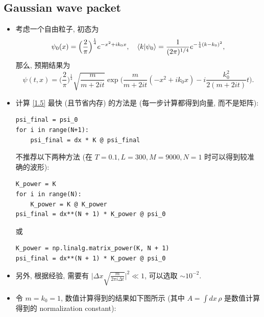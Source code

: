 \documentclass[10pt, a4paper]{article}
\numberwithin{equation}{section}
\begin{document}
	\subsection{Gaussian wave packet}
	\begin{itemize}
		\item 考虑一个自由粒子, 初态为
		\begin{equation}
			\psi_0(x) = \Big( \frac{2}{\pi} \Big)^{\frac{1}{4}} e^{- x^2 + i k_0 x}, \quad \braket{k | \psi_0} = \frac{1}{(2 \pi)^{1 / 4}} e^{- \frac{1}{4} (k - k_0)^2},
		\end{equation}
		那么, 预期结果为
		\begin{equation}
			\psi(t, x) = \Big( \frac{2}{\pi} \Big)^{\frac{1}{4}} \sqrt{\frac{m}{m + 2 i t}} \exp \Big( \frac{m}{m + 2 i t} (- x^2 + i k_0 x) - i \frac{k_0^2}{2 (m + 2 i t)} t \Big).
		\end{equation}
		
		\item 计算 \eqref{1.5} 最快 (且节省内存) 的方法是 (每一步计算都得到向量, 而不是矩阵):
		\begin{lstlisting}
psi_final = psi_0
for i in range(N+1):
	psi_final = dx * K @ psi_final
		\end{lstlisting}
		不推荐以下两种方法 (在 $T = 0.1, L = 300, M = 9000, N = 1$ 时可以得到较准确的波形):
		\begin{lstlisting}
K_power = K
for i in range(N):
	K_power = K @ K_power
psi_final = dx**(N + 1) * K_power @ psi_0
		\end{lstlisting}
		或
		\begin{lstlisting}
K_power = np.linalg.matrix_power(K, N + 1)
psi_final = dx**(N + 1) * K_power @ psi_0
		\end{lstlisting}
		
		\item 另外, 根据经验, 需要有 $\big| \Delta x \sqrt{\frac{m}{2 \pi i \Delta t}} \big|^2 \ll 1$, 可以选取 $\sim 10^{- 2}$.
		
		\item 令 $m = k_0 = 1$, 数值计算得到的结果如下图所示 (其中 $A = \int dx \, \rho$ 是数值计算得到的 normalization constant):
		

\end{itemize}
\end{document}

